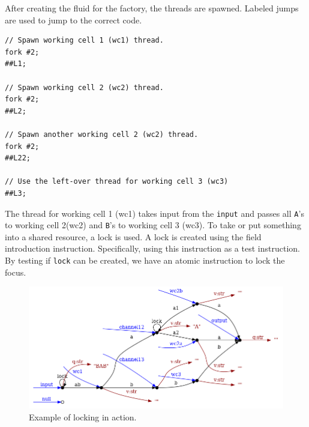 \documentclass[a4paper,12px]{article}
\begin{document}
After creating the fluid for the factory, the threads are spawned. Labeled jumps  are used to jump to the correct code.

\begin{verbatim}
// Spawn working cell 1 (wc1) thread.
fork #2;
##L1;

// Spawn working cell 2 (wc2) thread.
fork #2;
##L2;

// Spawn another working cell 2 (wc2) thread.
fork #2;
##L22;

// Use the left-over thread for working cell 3 (wc3)
##L3;
\end{verbatim}

The thread for working cell 1 (wc1) takes input from the \verb|input| and
passes all \verb|A|'s  to working cell 2(wc2) and \verb|B|'s to working cell 3
(wc3). To take or put something into a shared resource, a lock is used. A lock
is created using the field introduction instruction. Specifically, using this
instruction as a test instruction. By testing if \verb|lock| can be created, we
have an atomic instruction to lock the focus.
\begin{figure}[h]
    \centering
    \includegraphics[width=0.8\linewidth]{lock.png}
    \caption{Example of locking in action.}
    \label{fig:lock}
\end{figure}
\FloatBarrier%
\end{document}
